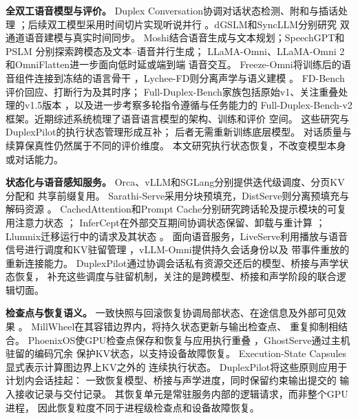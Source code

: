 \documentclass{article}
\begin{document}
\noindent\textbf{全双工语音模型与评价。}
Duplex Conversation协调对话状态检测、附和与插话处理
\citep{duplexconversation2022}；后续双工模型采用时间切片实现听说并行
\citep{duplexmodel2024}。dGSLM和SyncLLM分别研究
双通道语音建模与真实时间同步\citep{dgslm2023,syncllm2024}。
Moshi结合语音生成与文本规划\citep{moshi2024}；SpeechGPT和PSLM
分别探索跨模态及文本--语音并行生成\citep{speechgpt2023,pslm2024}；
LLaMA-Omni、LLaMA-Omni 2和OmniFlatten进一步面向低时延或端到端
语音交互\citep{llamaomni2025,llamaomni2_2025,omniflatten2025}。
Freeze-Omni将训练后的语音组件连接到冻结的语言骨干
\citep{freezeomni2025}，Lychee-FD则分离声学与语义建模
\citep{lychee2026}。
FD-Bench评价回应、打断行为及其时序\citep{fdbench2025}；
Full-Duplex-Bench家族包括原始v1、关注重叠处理的v1.5版本
\citep{fdbv1_2025,fdbv15_2025}，以及进一步考察多轮指令遵循与任务能力的
Full-Duplex-Bench-v2框架\citep{fdbv2_2026}。近期综述系统梳理了语音语言模型的架构、训练和评价
空间\citep{arora2025slm}。
这些研究与DuplexPilot的执行状态管理形成互补；
后者无需重新训练底层模型。
对话质量与续算保真性仍然属于不同的评价维度。
本文研究执行状态恢复，不改变模型本身或对话能力。

\noindent\textbf{状态化与语音感知服务。}
Orca、vLLM和SGLang分别提供迭代级调度、分页KV分配和
共享前缀复用\citep{orca2022,vllm2023,sglang2024}。
Sarathi-Serve采用分块预填充，DistServe则分离预填充与解码资源
\citep{sarathi2024,distserve2024}。
CachedAttention和Prompt Cache分别研究跨话轮及提示模块的可复用注意力状态
\citep{cachedattention2024,promptcache2024}；
InferCept在外部交互期间协调状态保留、卸载与重计算
\citep{infercept2024}；Llumnix迁移运行中的请求及其状态
\citep{llumnix2024}。
面向语音服务，LiveServe利用播放与语音信号进行调度和KV驻留管理
\citep{liveserve2026}，vLLM-Omni提供持久会话身份以及
带事件重放的重新连接能力\citep{omnidoc}。
DuplexPilot通过协调会话私有资源交还后的模型、桥接与声学状态恢复，
补充这些调度与驻留机制，关注的是跨模型、桥接和声学阶段的联合逻辑切面。

\noindent\textbf{检查点与恢复语义。}
一致快照与回滚恢复协调局部状态、在途信息及外部可见效果
\citep{chandy1985,elnozahy2002}。
MillWheel在其容错边界内，将持久状态更新与输出检查点、
重复抑制相结合\citep{millwheel2013}。
PhoenixOS使GPU检查点保存和恢复与应用执行重叠
\citep{phoenixos2025}，GhostServe通过主机驻留的编码冗余
保护KV状态，以支持设备故障恢复\citep{ghostserve2026}。
Execution-State Capsules显式表示计算图边界上KV之外的
连续执行状态\citep{capsules2026}。
DuplexPilot将这些原则应用于计划内会话挂起：
一致恢复模型、桥接与声学进度，同时保留约束输出提交的
输入接收记录与交付记录。
其恢复单元是常驻服务内部的逻辑请求，而非整个GPU进程，
因此恢复粒度不同于进程级检查点和设备故障恢复。
\end{document}

